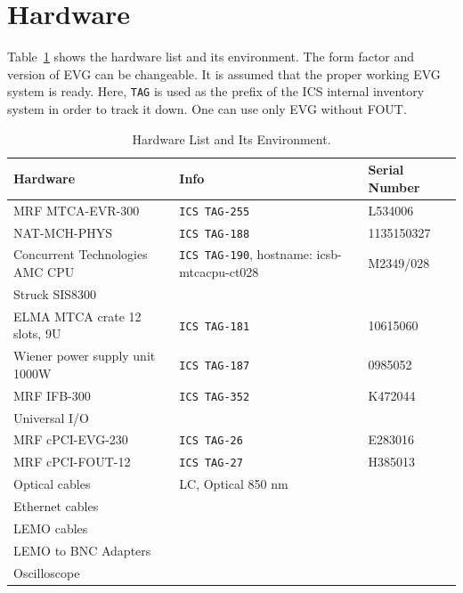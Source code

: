\documentclass[11pt
  , a4paper
  , article
  , oneside
  , showtrims
]{memoir}
\begin{document}
\section{Hardware}
Table~\ref{table:hwlist} shows the hardware list and its environment. The form factor and version of EVG can be changeable. It is assumed that the proper working EVG system is ready. Here, \texttt{TAG} is used as the prefix of the ICS internal inventory system in order to track it down. One can use only EVG without FOUT.
\begin{table}[!hb]
  \centering
  \begin{tabular}{l|l|l}
    \toprule
    Hardware                        & Info                                               & Serial Number \\\midrule
    MRF MTCA-EVR-300                & \texttt{ICS TAG-255}                               & L534006       \\\midrule
    NAT-MCH-PHYS                    & \texttt{ICS TAG-188}                               & 1135150327    \\\midrule
    Concurrent Technologies AMC CPU & \texttt{ICS TAG-190}, hostname: icsb-mtcacpu-ct028 & M2349/028     \\\midrule
    Struck SIS8300                  &                                &      \\\midrule
    ELMA MTCA crate 12 slots, 9U    & \texttt{ICS TAG-181}                               & 10615060      \\\midrule
    Wiener power supply unit 1000W  & \texttt{ICS TAG-187}                               & 0985052       \\\midrule
    MRF IFB-300                     & \texttt{ICS TAG-352}                               & K472044       \\\midrule
    Universal I/O                   &                                                    &               \\\midrule
    MRF cPCI-EVG-230                & \texttt{ICS TAG-26}                                & E283016       \\\midrule
    MRF cPCI-FOUT-12                & \texttt{ICS TAG-27}                                & H385013       \\\midrule
    Optical cables                  & LC, Optical 850 nm                                 &               \\\midrule
    Ethernet cables                 &                                                    &               \\\midrule
    LEMO cables                     &                                                    &               \\\midrule
    LEMO to BNC Adapters            &                                                    &               \\\midrule
    Oscilloscope                    &                                                    &               \\\bottomrule
  \end{tabular}
  \caption[]{Hardware List and Its Environment.}
  \label{table:hwlist}
\end{table}
\end{document}
